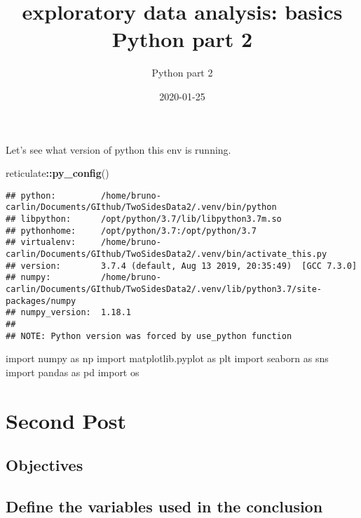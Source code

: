 \documentclass[]{article}
\title{exploratory data analysis: basics Python part 2}
\subtitle{Python part 2}
\author{}
\date{\vspace{-2.5em}2020-01-25}
\newenvironment{Shaded}{\begin{snugshade}}{\end{snugshade}}
\newcommand{\ImportTok}[1]{#1}
\newcommand{\KeywordTok}[1]{\textcolor[rgb]{0.13,0.29,0.53}{\textbf{#1}}}
\newcommand{\NormalTok}[1]{#1}
\newcommand{\OperatorTok}[1]{\textcolor[rgb]{0.81,0.36,0.00}{\textbf{#1}}}
\begin{document}
\maketitle

Let's see what version of python this env is running.

\begin{Shaded}
\begin{Highlighting}[]
\NormalTok{reticulate}\OperatorTok{::}\KeywordTok{py_config}\NormalTok{()}
\end{Highlighting}
\end{Shaded}

\begin{verbatim}
## python:         /home/bruno-carlin/Documents/GIthub/TwoSidesData2/.venv/bin/python
## libpython:      /opt/python/3.7/lib/libpython3.7m.so
## pythonhome:     /opt/python/3.7:/opt/python/3.7
## virtualenv:     /home/bruno-carlin/Documents/GIthub/TwoSidesData2/.venv/bin/activate_this.py
## version:        3.7.4 (default, Aug 13 2019, 20:35:49)  [GCC 7.3.0]
## numpy:          /home/bruno-carlin/Documents/GIthub/TwoSidesData2/.venv/lib/python3.7/site-packages/numpy
## numpy_version:  1.18.1
## 
## NOTE: Python version was forced by use_python function
\end{verbatim}

\begin{Shaded}
\begin{Highlighting}[]
\ImportTok{import}\NormalTok{ numpy }\ImportTok{as}\NormalTok{ np}
\ImportTok{import}\NormalTok{ matplotlib.pyplot }\ImportTok{as}\NormalTok{ plt}
\ImportTok{import}\NormalTok{ seaborn }\ImportTok{as}\NormalTok{ sns}
\ImportTok{import}\NormalTok{ pandas }\ImportTok{as}\NormalTok{ pd}
\ImportTok{import}\NormalTok{ os}
\end{Highlighting}
\end{Shaded}

\hypertarget{second-post}{%
\section{Second Post}\label{second-post}}

\hypertarget{objectives}{%
\subsection{Objectives}\label{objectives}}

\hypertarget{define-the-variables-used-in-the-conclusion}{%
\subsection{Define the variables used in the
conclusion}\label{define-the-variables-used-in-the-conclusion}}
\end{document}
